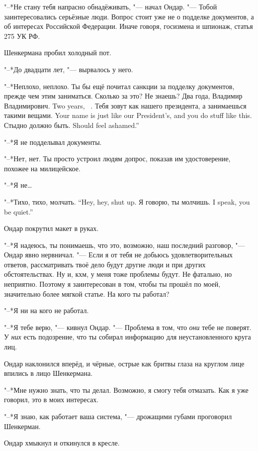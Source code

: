 "--*Не стану тебя напрасно обнадёживать, "--- начал Ондар.
"--- Тобой заинтересовались серьёзные люди.
Вопрос стоит уже не о подделке документов, а об интересах Российской Федерации.
Иначе говоря, госизмена и шпионаж, статья 275 УК РФ.

Шенкермана пробил холодный пот.

"--*До двадцати лет, "--- вырвалось у него.

"--*Неплохо, неплохо.
Ты бы ещё почитал санкции за подделку документов, прежде чем этим заниматься.
Сколько за это?
Не знаешь?
{Два года, Владимир Владимирович.}
{Two years, \Vladimir\ \Vladimirovich.}
{Тебя зовут как нашего президента, а занимаешься такими вещами.}
{Your name is just like our President's, and you do stuff like this.}
{Стыдно должно быть.}
{Should feel ashamed.''}

"--*Я не подделывал документы.

"--*Нет, нет.
Ты просто устроил людям допрос, показав им удостоверение, похожее на милицейское.

"--*Я не\dots{}

{"--*Тихо, тихо, молчать.}
{``Hey, hey, shut up.}
{Я говорю, ты молчишь.}
{I speak, you be quiet.''}

Ондар покрутил макет в руках.

"--*Я надеюсь, ты понимаешь, что это, возможно, наш последний разговор, "--- Ондар явно нервничал.
"--- Если я от тебя не добьюсь удовлетворительных ответов, рассматривать твоё дело будут другие люди и при других обстоятельствах.
Ну и, кхм, у меня тоже проблемы будут.
Не фатально, но неприятно.
Поэтому я заинтересован в том, чтобы ты прошёл по моей, значительно более мягкой статье.
На кого ты работал?

"--*Я ни на кого не работал.

"--*Я тебе верю, "--- кивнул Ондар.
"--- Проблема в том, что \emph{они} тебе не поверят.
У \emph{них} есть подозрение, что ты собирал информацию для неустановленного круга лиц.

Ондар наклонился вперёд, и чёрные, острые как бритвы глаза на круглом лице впились в лицо Шенкермана.

"--*Мне нужно знать, что ты делал.
Возможно, я смогу тебя отмазать.
Как я уже говорил, это в моих интересах.

"--*Я знаю, как работает ваша система, "--- дрожащими губами проговорил Шенкерман.

Ондар хмыкнул и откинулся в кресле.


